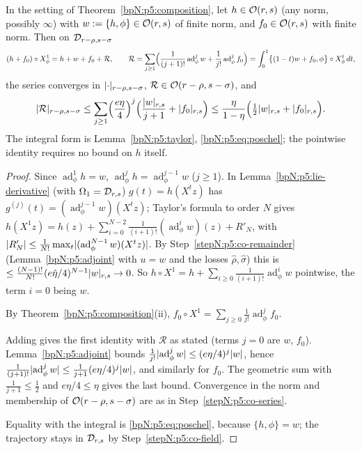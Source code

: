 \begin{proposition}\label{bpN:p5:transform}
In the setting of Theorem~\ref{bpN:p5:composition}, let $h\in\mathcal O(r,s)$ (any norm, possibly $\infty$) with $w:=\{h,\phi\}\in\mathcal O(r,s)$ of finite norm, and $f_0\in\mathcal O(r,s)$ with finite norm. Then on $\mathcal D_{r-\rho,s-\sigma}$
\[(h+f_0)\circ X_\phi^1=h+w+f_0+\mathcal R,\qquad\mathcal R=\sum_{j\ge1}\Bigl(\frac1{(j+1)!}\operatorname{ad}^j_\phi w+\frac1{j!}\operatorname{ad}^j_\phi f_0\Bigr)=\int_0^1\bigl\{(1-t)w+f_0,\phi\bigr\}\circ X^t_\phi\,dt,\]
the series converges in $\lvert \cdot\rvert_{r-\rho,s-\sigma}$, $\mathcal R\in\mathcal O(r-\rho,s-\sigma)$, and
\[\lvert \mathcal R\rvert_{r-\rho,s-\sigma}\le\sum_{j\ge1}\Bigl(\frac{e\eta}4\Bigr)^j\Bigl(\frac{\lvert w\rvert_{r,s}}{j+1}+\lvert f_0\rvert_{r,s}\Bigr)\le\frac\eta{1-\eta}\Bigl(\tfrac12\lvert w\rvert_{r,s}+\lvert f_0\rvert_{r,s}\Bigr).\]
The integral form is Lemma~\ref{bpN:p5:taylor}, \eqref{bpN:p5:eq:poschel}; the pointwise identity requires no bound on $h$ itself.
\end{proposition}
\begin{proof}
\label{stepN:p5:tr-h} Since $\operatorname{ad}^1_\phi h=w$, $\operatorname{ad}^{j}_\phi h=\operatorname{ad}^{j-1}_\phi w$ ($j\ge1$). In Lemma~\ref{bpN:p5:lie-derivative} (with $\Omega_1=\mathcal D_{r,s}$) $g(t)=h(X^tz)$ has $g^{(j)}(t)=(\operatorname{ad}^{j-1}_\phi w)(X^tz)$; Taylor's formula to order $N$ gives
$h(X^1z)=h(z)+\sum_{i=0}^{N-2}\frac1{(i+1)!}(\operatorname{ad}^i_\phi w)(z)+R'_N$, with $\lvert R'_N\rvert\le\frac1{N!}\max_t\lvert (\operatorname{ad}^{N-1}_\phi w)(X^tz)\rvert$.
By Step~\ref{stepN:p5:co-remainder} (Lemma~\ref{bpN:p5:adjoint} with $u=w$ and the losses $\hat\rho,\hat\sigma$) this is $\le\frac{(N-1)!}{N!}(e\hat\eta/4)^{N-1}\lvert w\rvert_{r,s}\to0$. So $h\circ X^1=h+\sum_{i\ge0}\frac1{(i+1)!}\operatorname{ad}^i_\phi w$ pointwise, the term $i=0$ being $w$.

\label{stepN:p5:tr-f} By Theorem~\ref{bpN:p5:composition}(ii), $f_0\circ X^1=\sum_{j\ge0}\frac1{j!}\operatorname{ad}^j_\phi f_0$.

\label{stepN:p5:tr-sum} Adding gives the first identity with $\mathcal R$ as stated (terms $j=0$ are $w$, $f_0$). Lemma~\ref{bpN:p5:adjoint} bounds $\frac1{j!}\lvert \operatorname{ad}^j_\phi w\rvert\le(e\eta/4)^j\lvert w\rvert$, hence $\frac1{(j+1)!}\lvert \operatorname{ad}^j_\phi w\rvert\le\frac1{j+1}(e\eta/4)^j\lvert w\rvert$, and similarly for $f_0$. The geometric sum with $\frac1{j+1}\le\frac12$ and $e\eta/4\le\eta$ gives the last bound. Convergence in the norm and membership of $\mathcal O(r-\rho,s-\sigma)$ are as in Step~\ref{stepN:p5:co-series}.

\label{stepN:p5:tr-int} Equality with the integral is \eqref{bpN:p5:eq:poschel}, because $\{h,\phi\}=w$; the trajectory stays in $\mathcal D_{r,s}$ by Step~\ref{stepN:p5:co-field}.
\end{proof}


